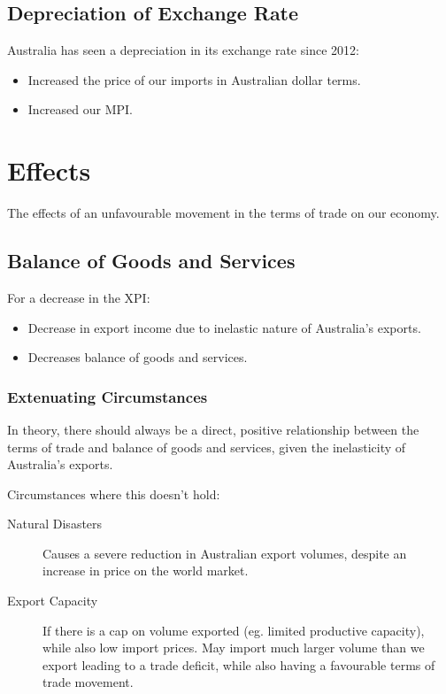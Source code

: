 \documentclass[a4paper,11pt]{article}
\begin{document}
\subsection{Depreciation of Exchange Rate}

Australia has seen a depreciation in its exchange rate since 2012:

\begin{itemize}
\item Increased the price of our imports in Australian dollar terms.
\item Increased our MPI.
\end{itemize}




\section{Effects}

The effects of an unfavourable movement in the terms of trade on our economy.


\subsection{Balance of Goods and Services}

For a decrease in the XPI:

\begin{itemize}
\item Decrease in export income due to inelastic nature of Australia's exports.
\item Decreases balance of goods and services.
\end{itemize}


\subsubsection{Extenuating Circumstances}

In theory, there should always be a direct, positive relationship between the
terms of trade and balance of goods and services, given the inelasticity of
Australia's exports.

Circumstances where this doesn't hold:

\begin{description}
\item [Natural Disasters] Causes a severe reduction in Australian export
	volumes, despite an increase in price on the world market.
\item [Export Capacity] If there is a cap on volume exported (eg. limited
	productive capacity), while also low import prices. May import much larger
	volume than we export leading to a trade deficit, while also having a
	favourable terms of trade movement.
\end{description}
\end{document}
